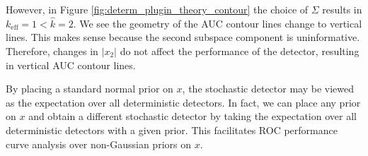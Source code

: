However, in Figure \ref{fig:determ_plugin_theory_contour} the choice of $\Sigma$ results in $k_\text{eff}=1<\widehat{k}=2$. We see the geometry of the AUC contour lines change to vertical lines. This makes sense because the second subspace component is uninformative. Therefore, changes in $|x_2|$ do not affect the performance of the detector, resulting in vertical AUC contour lines.

By placing a standard normal prior on $x$, the stochastic detector may be viewed as the expectation over all deterministic detectors. In fact, we can place any prior on $x$ and obtain a different stochastic detector by taking the expectation over all deterministic detectors with a given prior. This facilitates ROC performance curve analysis over non-Gaussian priors on $x$. 